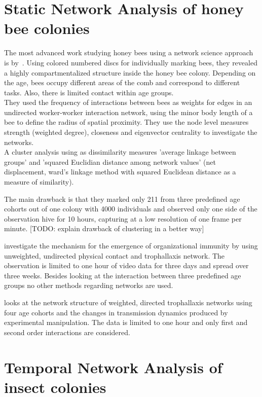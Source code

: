 \section{Static Network Analysis of honey bee colonies}
The most advanced work studying honey bees using a network science approach is by~\textcite{baracchi2014socio}. Using colored numbered discs for individually marking bees, they revealed a highly compartmentalized structure inside the honey bee colony. Depending on the age, bees occupy different areas of the comb and correspond to different tasks. Also, there is limited contact within age groups.\\
They used the frequency of interactions between bees as weights for edges in an undirected worker-worker interaction network, using the minor body length of a bee to define the radius of spatial proximity.
They use the node level measures strength (weighted degree), closeness and eigenvector centrality to investigate the networks.\\
A cluster analysis using as dissimilarity measures 'average linkage between groups' and 'squared Euclidian distance among network values' (net displacement, ward's linkage method with squared Euclidean distance as a measure of similarity).

The main drawback is that they marked only 211 from three predefined age cohorts out of one colony with 4000 individuals and observed only one side of the observation hive for 10 hours, capturing at a low resolution of one frame per minute. [TODO: explain drawback of clustering in a better way]

\textcite{scholl2011olfactory} investigate the mechanism for the emergence of organizational immunity by using unweighted, undirected physical contact and trophallaxis network. The observation is limited to one hour of video data for three days and spread over three weeks. Besides looking at the interaction between three predefined age groups no other methods regarding networks are used.

\textcite{naug2008structure} looks at the network structure of weighted,  directed trophallaxis networks using four age cohorts and the changes in transmission dynamics produced by experimental manipulation. The data is limited to one hour and only first and second order interactions are considered.

\section{Temporal Network Analysis of insect colonies}

